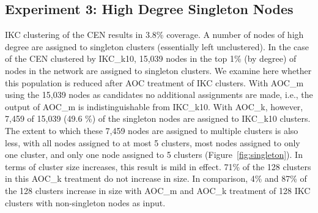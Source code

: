 \documentclass[12pt, oneside]{article}   	%
\begin{document}
	\subsection{Experiment 3: High Degree Singleton Nodes} 
	
	IKC clustering of the CEN results in 3.8\% coverage. A number of nodes of high degree are assigned to singleton clusters (essentially left unclustered). In the case of the CEN clustered by IKC\_k10, 15,039 nodes in the top 1\% (by degree) of nodes in the network are assigned to singleton clusters. We examine here whether this population is reduced after AOC treatment of IKC clusters. With AOC\_m using the 15,039 nodes as candidates no additional assignments are made, i.e., the output of AOC\_m is indistinguishable from IKC\_k10. With AOC\_k, however, 7,459 of 15,039 (49.6 \%) of the singleton nodes are assigned to IKC\_k10 clusters. The extent to which these 7,459 nodes are assigned to multiple clusters is also less, with all nodes assigned to at most 5 clusters, most nodes assigned to only one cluster, and only one node assigned to 5 clusters (Figure~\ref{fig:singleton}). In terms of cluster size increases, this result is mild in effect. 71\% of the 128 clusters in this AOC\_k treatment do not increase in size. In comparison, 4\% and 87\% of the 128 clusters increase in size with AOC\_m and AOC\_k treatment of 128 IKC clusters with non-singleton nodes as input.  
	
\end{document}
